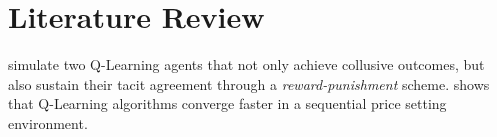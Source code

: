 \section{Literature Review}

\textcite{calvano_artificial_2019} simulate two Q-Learning agents that not only achieve collusive outcomes, but also sustain their tacit agreement through a \emph{reward-punishment} scheme. \textcite{klein_autonomous_2019} shows that Q-Learning algorithms converge faster in a sequential price setting environment.